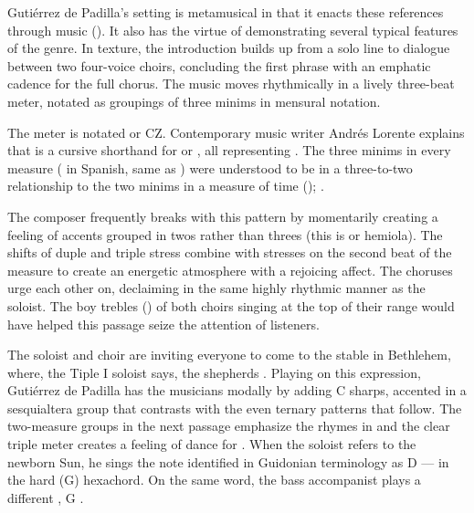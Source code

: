 Gutiérrez de Padilla's setting is metamusical in that it enacts these
references through music ().
It also has the virtue of demonstrating several typical features of the genre.
In texture, the introduction builds up from a solo line to dialogue between two
four-voice choirs, concluding the first phrase with an emphatic cadence for the
full chorus.
The music moves rhythmically in a lively three-beat meter, notated as groupings
of three minims in mensural notation.%
\begin{Footnote}
    The meter is notated \meterCZ{} or CZ.
    Contemporary music writer Andrés Lorente explains that \meterCZ{} is a
    cursive shorthand for \meterCThreeTwo or \meterCThree, all representing
    .
    The three minims in every measure ( in Spanish, same as
    ) were understood to be in a three-to-two relationship to the
    two minims in a measure of  time ();
    \autocites
    [156, 165, 210]{Lorente:Porque}
    [537]{Cerone:Melopeo}.
\end{Footnote}
The composer frequently breaks with this pattern by momentarily creating a
feeling of accents grouped in twos rather than threes (this is
 or hemiola).
The shifts of duple and triple stress combine with stresses on the second beat
of the measure to create an energetic atmosphere with a rejoicing affect.  
The choruses urge each other on, declaiming in the same highly rhythmic manner
as the soloist.
The boy trebles () of both choirs singing at the top of their
range would have helped this passage seize the attention of listeners.

The soloist and choir are inviting everyone to come to the stable in Bethlehem,
where, the Tiple I soloist says, the shepherds .
Playing on this expression, Gutiérrez de Padilla has the musicians
 modally by adding C sharps, accented in a sesquialtera group that
contrasts with the even ternary patterns that follow.
The two-measure groups in the next passage emphasize the rhymes in
 and the clear triple meter creates a
feeling of dance for .
When the soloist refers to the newborn Sun, he sings the note identified in
Guidonian terminology as D --- in the hard (G)
hexachord.  
On the same word, the bass accompanist plays a different , G
.

